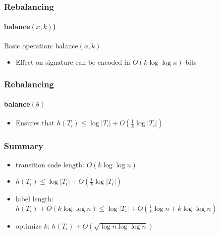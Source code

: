 \documentclass[aspectratio=169,xcolor=dvipsnames]{beamer}
\begin{document}
\begin{frame}
    \frametitle{Rebalancing}
    \framesubtitle{balance$(x,k)$)}

    Basic operation: balance$(x,k)$
    \begin{center}
    \end{center}
    \begin{itemize}
        \item<5->Effect on signature can be encoded in $O(k\log\log n)$ bits
    \end{itemize}
\end{frame}

\begin{frame}
    \frametitle{Rebalancing}
    \framesubtitle{balance$(\theta)$}

    \begin{center}
    \end{center}
    \begin{itemize}
        \item<5->Ensures that $h(T_i)\le \log|T_i| + O(\tfrac{1}{k}\log|T_i|)$
    \end{itemize}
\end{frame}

\begin{frame}
    \frametitle{Summary}
    \begin{itemize}[<+->]
        \item transition code length: $O(k\log\log n)$
        \item $h(T_i) \le \log|T_i| + O(\tfrac{1}{k}\log|T_i|)$
        \item label length: $h(T_i) + O(k\log\log n)\le \log|T_i| + O(\tfrac{1}{k}\log n + k\log\log n)$
        \item optimize $k$: $h(T_i) + O(\sqrt{\log n\log\log n})$
    \end{itemize}
\end{frame}
\end{document}
